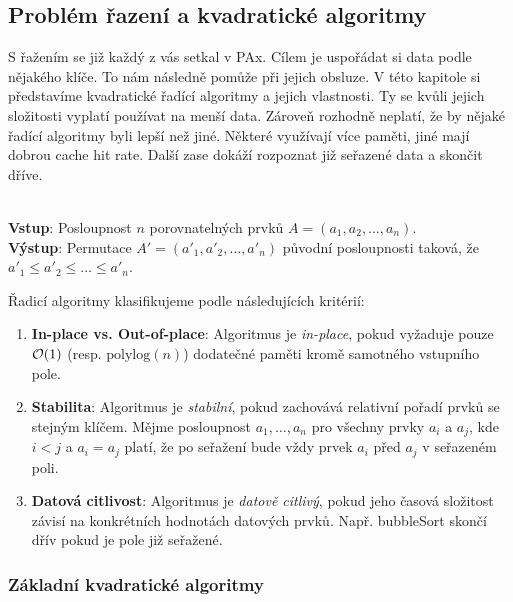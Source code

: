 \subsection{Problém řazení a kvadratické algoritmy}

S řažením se již každý z vás setkal v PAx. Cílem je uspořádat si data podle nějakého klíče. To nám následně pomůže při jejich obsluze. V této kapitole si představíme kvadratické řadící algoritmy a jejich vlastnosti. Ty se kvůli jejich složitosti vyplatí používat na menší data. Zároveň rozhodně neplatí, že by nějaké řadící algoritmy byli lepší než jiné. Některé využívají více paměti, jiné mají dobrou cache hit rate. Další zase dokáží rozpoznat již seřazené data a skončit dříve.\medskip

\begin{definition}
\leavevmode\\
\textbf{Vstup}: Posloupnost $n$ porovnatelných prvků $A = (a_1, a_2, \dots, a_n)$.\\
\textbf{Výstup}: Permutace $A' = (a'_1, a'_2, \dots, a'_n)$ původní posloupnosti taková, že $a'_1 \le a'_2 \le \dots \le a'_n$.
\end{definition}  \medskip

\begin{definition}
Řadicí algoritmy klasifikujeme podle následujících kritérií:
\begin{enumerate}
    \item \textbf{In-place vs. Out-of-place}: Algoritmus je \textit{in-place}, pokud vyžaduje pouze $\mathcal{O}(1)$ (resp. $\text{polylog}(n)$) dodatečné paměti kromě samotného vstupního pole.
    \item \textbf{Stabilita}: Algoritmus je \textit{stabilní}, pokud zachovává relativní pořadí prvků se stejným klíčem. Mějme posloupnost $a_1, \dots, a_n$ pro všechny prvky $a_i$ a $a_j$, kde $i < j$ a $a_i = a_j$ platí, že po seřažení bude vždy prvek $a_i$ před $a_j$ v seřazeném poli.
    \item \textbf{Datová citlivost}: Algoritmus je \textit{datově citlivý}, pokud jeho časová složitost závisí na konkrétních hodnotách datových prvků. Např. bubbleSort skončí dřív pokud je pole již seřažené. 
\end{enumerate}
\end{definition} \bigskip

\subsubsection{Základní kvadratické algoritmy}

